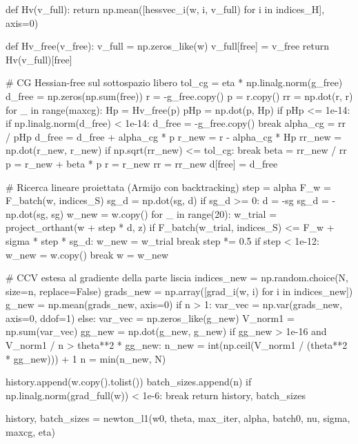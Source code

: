 \documentclass[a4paper,12pt]{article}
\numberwithin{equation}{section}
\numberwithin{figure}{section}
\numberwithin{table}{section}
\begin{document}
\begin{pythoncode}[title= Newton-L1]
            def Hv(v_full):
                return np.mean([hessvec_i(w, i, v_full) for i in indices_H],
                               axis=0)

            def Hv_free(v_free):
                v_full = np.zeros_like(w)
                v_full[free] = v_free
                return Hv(v_full)[free]

            # CG Hessian-free sul sottospazio libero
            tol_cg = eta * np.linalg.norm(g_free)
            d_free = np.zeros(np.sum(free))
            r = -g_free.copy()
            p = r.copy()
            rr = np.dot(r, r)
            for _ in range(maxcg):
                Hp = Hv_free(p)
                pHp = np.dot(p, Hp)
                if pHp <= 1e-14:
                    if np.linalg.norm(d_free) < 1e-14:
                        d_free = -g_free.copy()
                    break
                alpha_cg = rr / pHp
                d_free = d_free + alpha_cg * p
                r_new = r - alpha_cg * Hp
                rr_new = np.dot(r_new, r_new)
                if np.sqrt(rr_new) <= tol_cg:
                    break
                beta = rr_new / rr
                p = r_new + beta * p
                r = r_new
                rr = rr_new
            d[free] = d_free

        # Ricerca lineare proiettata (Armijo con backtracking)
        step = alpha
        F_w = F_batch(w, indices_S)
        sg_d = np.dot(sg, d)
        if sg_d >= 0:
            d = -sg
            sg_d = -np.dot(sg, sg)
        w_new = w.copy()
        for _ in range(20):
            w_trial = project_orthant(w + step * d, z)
            if F_batch(w_trial, indices_S) <= F_w + sigma * step * sg_d:
                w_new = w_trial
                break
            step *= 0.5
            if step < 1e-12:
                w_new = w.copy()
                break
        w = w_new

        # CCV estesa al gradiente della parte liscia
        indices_new = np.random.choice(N, size=n, replace=False)
        grads_new = np.array([grad_i(w, i) for i in indices_new])
        g_new = np.mean(grads_new, axis=0)
        if n > 1:
            var_vec = np.var(grads_new, axis=0, ddof=1)
        else:
            var_vec = np.zeros_like(g_new)
        V_norm1 = np.sum(var_vec)
        gg_new = np.dot(g_new, g_new)
        if gg_new > 1e-16 and V_norm1 / n > theta**2 * gg_new:
            n_new = int(np.ceil(V_norm1 / (theta**2 * gg_new))) + 1
            n = min(n_new, N)

        history.append(w.copy().tolist())
        batch_sizes.append(n)
        if np.linalg.norm(grad_full(w)) < 1e-6:
            break
    return history, batch_sizes

history, batch_sizes = newton_l1(w0, theta, max_iter, alpha, batch0,
                                 nu, sigma, maxcg, eta)
\end{pythoncode}
\end{document}
